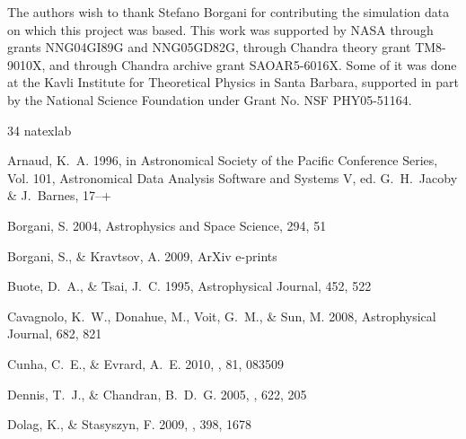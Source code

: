 \documentclass[12pt,preprint]{aastex}
\begin{document}
\acknowledgments The authors wish to thank Stefano Borgani for
contributing the simulation data on which this project was based.
This work was supported by NASA through grants NNG04GI89G and
NNG05GD82G, through Chandra theory grant TM8-9010X, and through
Chandra archive grant SAOAR5-6016X.  Some of it was done at the Kavli Institute for Theoretical Physics in Santa Barbara, supported in part by the National Science Foundation under Grant No. NSF PHY05-51164.

%

\begin{thebibliography}{34}
\expandafter\ifx\csname natexlab\endcsname\relax\def\natexlab#1{#1}\fi

{Arnaud}, K.~A. 1996, in Astronomical Society of the Pacific Conference Series,
  Vol. 101, Astronomical Data Analysis Software and Systems V, ed.
  {G.~H.~Jacoby \& J.~Barnes}, 17--+

Borgani, S. 2004, Astrophysics and Space Science, 294, 51

{Borgani}, S., \& {Kravtsov}, A. 2009, ArXiv e-prints

Buote, D.~A., \& Tsai, J.~C. 1995, Astrophysical Journal, 452, 522

Cavagnolo, K.~W., Donahue, M., Voit, G.~M., \& Sun, M. 2008, Astrophysical
  Journal, 682, 821

{Cunha}, C.~E., \& {Evrard}, A.~E. 2010, \prd, 81, 083509

{Dennis}, T.~J., \& {Chandran}, B.~D.~G. 2005, \apj, 622, 205

{Dolag}, K., \& {Stasyszyn}, F. 2009, \mnras, 398, 1678


\end{thebibliography}
\end{document}
